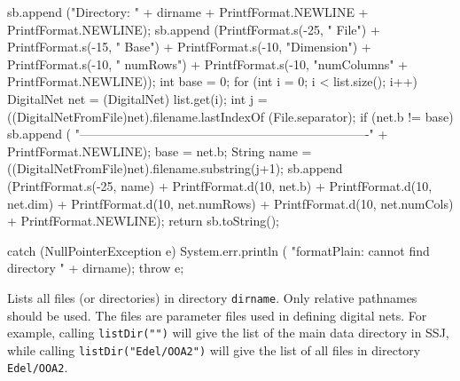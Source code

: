 \begin{code}
\begin{hide}
{{         sb.append ("Directory:   " + dirname  + PrintfFormat.NEWLINE +
                    PrintfFormat.NEWLINE);
         sb.append (PrintfFormat.s(-25, "     File") +
                    PrintfFormat.s(-15, "       Base") +
                    PrintfFormat.s(-10, "Dimension") +
                    PrintfFormat.s(-10, " numRows") +
                    PrintfFormat.s(-10, "numColumns" +
                    PrintfFormat.NEWLINE));
         int base = 0;
         for (int i = 0; i < list.size(); i++) {
            DigitalNet net = (DigitalNet) list.get(i);
            int j = ((DigitalNetFromFile)net).filename.lastIndexOf
                (File.separator);
            if (net.b != base) {
               sb.append (
      "----------------------------------------------------------------------"
            + PrintfFormat.NEWLINE);
            base = net.b;
            }
            String name = ((DigitalNetFromFile)net).filename.substring(j+1);
            sb.append (PrintfFormat.s(-25, name) +
                       PrintfFormat.d(10, net.b) +
                       PrintfFormat.d(10, net.dim) +
                       PrintfFormat.d(10, net.numRows) +
                       PrintfFormat.d(10, net.numCols) +
                       PrintfFormat.NEWLINE);
         }
         return sb.toString();

      } catch (NullPointerException e) {
         System.err.println (
            "formatPlain: cannot find directory   " + dirname);
         throw e;
      }
   }\end{hide}
\end{code}
\begin{tabb}
  Lists all files (or directories) in directory \texttt{dirname}. Only relative
  pathnames should be used. The files are  parameter files used in defining
  digital nets.  For example, calling \texttt{listDir("")} will give the list
  of the main data directory in SSJ, while calling \texttt{listDir("Edel/OOA2")}
  will give the list of all files in directory \texttt{Edel/OOA2}.
 \end{tabb}
